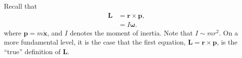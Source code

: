 \documentclass[10pt]{mypackage}
\begin{document}
\begin{example}\hfill
  Recall that
  \begin{align*}
    \mathbf{L} &= \mathbf{r}\times \mathbf{p},\\
               &= I\boldsymbol{\omega}.
  \end{align*}
  where $\mathbf{p} = m\dot{\mathbf{x}}$, and $I$ denotes the moment of inertia. Note that $I\sim mr^2$. On a more fundamental level, it is the case that the first equation, $\mathbf{L} = \mathbf{r}\times \mathbf{p}$, is the ``true'' definition of $\mathbf{L}$.


\end{example}
\end{document}
